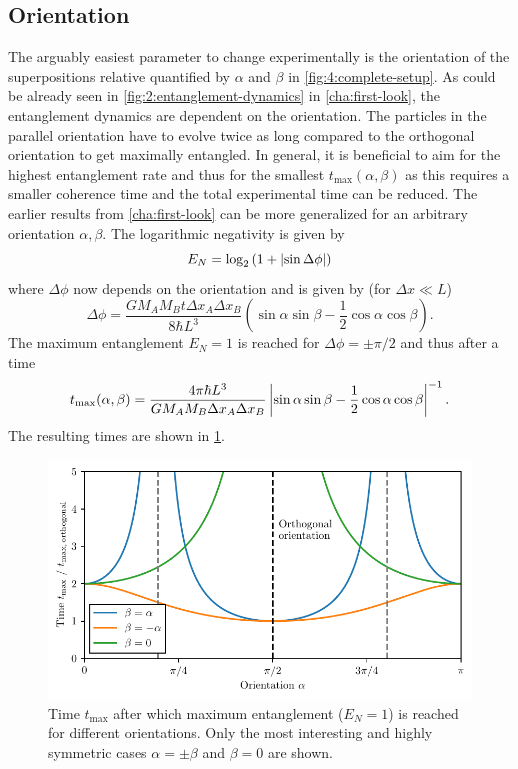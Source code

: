 \subsection{Orientation}
The arguably easiest parameter to change experimentally is the orientation of the superpositions relative quantified by $\alpha$ and $\beta$ in \cref{fig:4:complete-setup}.
As could be already seen in \cref{fig:2:entanglement-dynamics} in \cref{cha:first-look}, the entanglement dynamics are dependent on the orientation. 
The particles in the parallel orientation have to evolve twice as long compared to the orthogonal orientation to get maximally entangled.
In general, it is beneficial to aim for the highest entanglement rate and thus for the smallest $t_\mathrm{max}(\alpha, \beta)$ as this requires a smaller coherence time and the total experimental time can be reduced.
The earlier results from \cref{cha:first-look} can be more generalized for an arbitrary orientation $\alpha, \beta$. The logarithmic negativity is given by
\begin{equation}
  E_N = \log_2\left(1+\left\lvert\sin\Delta\phi\right\rvert\right)
\end{equation}
where $\Delta\phi$ now depends on the orientation and is given by (for $\Delta x \ll L$)
\begin{equation}
  \Delta \phi = \frac{G M_A M_B t \Delta x_A \Delta x_B}{8\hbar L^3} \left(\sin\alpha\sin\beta-\frac{1}{2}\cos\alpha\cos\beta\right) .
\end{equation}
The maximum entanglement $E_N=1$ is reached for $\Delta\phi = \pm \pi/2$ and thus after a time
\begin{equation}\label{eq:4:t-max}
  t_\mathrm{max}(\alpha,\beta) = \frac{4\pi \hbar L^3}{G M_A M_B \Delta x_A \Delta x_B}\left\lvert\sin\alpha\sin\beta - \frac{1}{2}\cos\alpha\cos\beta\right\rvert^{-1}.
\end{equation}
The resulting times are shown in \cref{fig:4:t-max-orientation}.
\begin{figure}[!htbp]
  \centering
  \includegraphics[width=\textwidth]{./../figures/ideal-entanglement/t-max-orientation.pdf}
  \caption{Time $t_\mathrm{max}$ after which maximum entanglement ($E_N = 1$) is reached for different orientations. Only the most interesting and highly symmetric cases $\alpha=\pm\beta$ and $\beta=0$ are shown.}
  \label{fig:4:t-max-orientation}
\end{figure}
